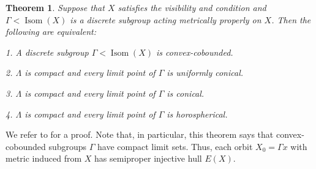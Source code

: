 \documentclass[12pt]{amsbook}%
\newtheorem{thm}{Theorem}[chapter]
\theoremstyle{definition}
\theoremstyle{remark}
\numberwithin{section}{chapter}
\numberwithin{subsection}{section}
\numberwithin{figure}{chapter}
\DeclareMathOperator{\Isom}{Isom}
\DeclareMathOperator{\hull}{hull}
\def\Ga{\Gamma}
\def\La{\Lambda}
\def\geo{\partial_\infty}
\begin{document}
\begin{thm}\label{thm:qccc}
Suppose that $X$ satisfies the visibility and condition and $\Ga< \Isom(X)$ is a discrete subgroup acting metrically properly on $X$. Then the following are equivalent:

1. A discrete subgroup $\Ga< \Isom(X)$ is convex-cobounded.  

2. $\La$ is compact and every limit point of $\Ga$ is uniformly conical. 

3. $\La$ is compact and every limit point of $\Ga$ is conical. 

4. $\La$ is compact and every limit point of $\Ga$ is horospherical. 






\end{thm}

We refer to \cite[Theorem 12.2.7]{DSU} for a proof. Note that, in particular, this theorem says that convex-cobounded subgroups $\Ga$ have compact limit sets. Thus, each orbit $X_0=\Ga x$ with metric induced from $X$ has semiproper injective hull $E(X)$.  
\end{document}

